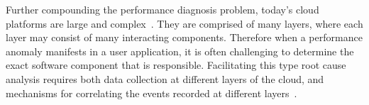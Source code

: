 %

Further compounding the performance
diagnosis problem, today's cloud platforms are 
large and complex~\cite{DaCunhaRodrigues:2016:MCC:2851613.2851619,Ibidunmoye:2015:PAD:2808687.2791120}. 
They are
comprised of many layers, where each layer may consist of many interacting components.
Therefore when a performance anomaly manifests in a user application, it is
often challenging
to determine the exact software component that is responsible. 
Facilitating this type root cause analysis requires
both data collection at different layers of the cloud, and mechanisms for correlating 
the events recorded at different layers~\cite{7420511}. 
%
%


